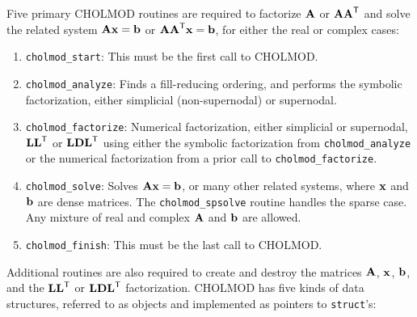 \documentclass[11pt]{article}
\newcommand{\m}[1]{{\bf{#1}}}       %
\newcommand{\tr}{^{\sf T}}          %
\begin{document}
Five primary CHOLMOD routines are required to factorize $\m{A}$ or $\m{AA}\tr$
and solve the related system $\m{Ax}=\m{b}$ or $\m{AA}\tr\m{x}=\m{b}$,
for either the real or complex cases:
\begin{enumerate}
\item {\tt cholmod\_start}:
    This must be the first call to CHOLMOD.

\item {\tt cholmod\_analyze}:
    Finds a fill-reducing ordering, and performs the symbolic factorization,
    either simplicial (non-supernodal) or supernodal.

\item {\tt cholmod\_factorize}:
    Numerical factorization, either simplicial or supernodal, $\m{LL}\tr$ or $\m{LDL}\tr$
    using either the symbolic factorization from {\tt cholmod\_analyze} or the numerical
    factorization from a prior call to {\tt cholmod\_factorize}.

\item {\tt cholmod\_solve}:
    Solves $\m{Ax}=\m{b}$, or many other related systems, where $\m{x}$ and
    $\m{b}$ are dense matrices.  The {\tt cholmod\_spsolve} routine handles
    the sparse case.  Any mixture of real and complex $\m{A}$ and $\m{b}$ are
    allowed.

\item {\tt cholmod\_finish}:
    This must be the last call to CHOLMOD.
\end{enumerate}

Additional routines are also required to create and destroy
the matrices $\m{A}$, $\m{x}$, $\m{b}$, and the $\m{LL}\tr$ or $\m{LDL}\tr$ factorization.
CHOLMOD has five kinds of data structures, referred to as objects and implemented
as pointers to {\tt struct}'s:
\end{document}
